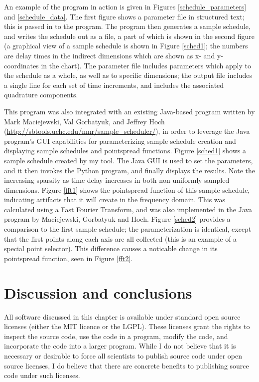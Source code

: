 An example of the program in action is given in Figures \ref{schedule_parameters} 
and \ref{schedule_data}.  The first figure shows a parameter file in structured
text; this is passed in to the program.  The program then generates a sample
schedule, and writes the schedule out as a file, a part of which is shown in
the second figure (a graphical view of a sample schedule is shown in Figure \ref{sched1};
the numbers are delay times in the indirect dimensions which are shown as x- 
and y-coordinates in the chart).  The parameter file includes parameters which 
apply to the schedule as a whole, as well as to specific dimensions; the output
file includes a single line for each set of time increments, and includes the
associated quadrature components.

This program was also integrated with an existing Java-based program written
by Mark Maciejewski, Val Gorbatyuk, and Jeffrey Hoch 
(\url{http://sbtools.uchc.edu/nmr/sample_scheduler/}), in order to leverage
the Java program's GUI capabilities for parameterizing sample schedule creation
and displaying sample schedules and pointspread functions.
Figure \ref{sched1} shows a sample schedule created by my tool.  The Java
GUI is used to set the parameters, and it then invokes the Python program,
and finally displays the results.  Note the increasing
sparsity as time delay increases in both non-uniformly sampled dimensions.
Figure \ref{fft1} shows the pointspread function of this sample schedule,
indicating artifacts that it will create in the frequency domain.  This was 
calculated using a Fast Fourier Transform, and was also implemented in the
Java program by Maciejewski, Gorbatyuk and Hoch.  Figure \ref{sched2} provides
a comparison to the first sample schedule; the parameterization is identical,
except that the first points along each axis are all collected (this is an
example of a special point selector).  This difference causes a noticable 
change in its pointspread function, seen in Figure \ref{fft2}.



\section{Discussion and conclusions}

All software discussed in this chapter is available under standard open source
licenses (either the MIT licence or the LGPL).  These licenses grant the rights
to inspect the source code, use the code in a program, modify the code, and
incorporate the code into a larger program.  While I do not believe that it is
necessary or desirable to force all scientists to publish source code under
open source licenses, I do believe that there are concrete benefits
to publishing source code under such licenses.  

